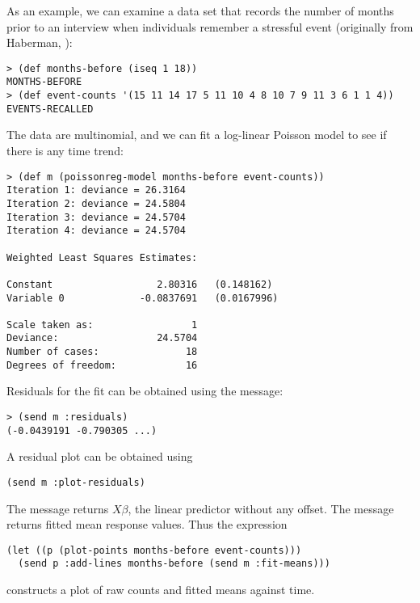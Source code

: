 As an example, we can examine a data set that records the number of
months prior to an interview when individuals remember a stressful
event (originally from Haberman, \cite[p. 2]{JKL}):
\begin{verbatim}
> (def months-before (iseq 1 18))
MONTHS-BEFORE
> (def event-counts '(15 11 14 17 5 11 10 4 8 10 7 9 11 3 6 1 1 4))
EVENTS-RECALLED
\end{verbatim}
The data are multinomial, and we can fit a log-linear Poisson model to
see if there is any time trend:
\begin{verbatim}
> (def m (poissonreg-model months-before event-counts))
Iteration 1: deviance = 26.3164
Iteration 2: deviance = 24.5804
Iteration 3: deviance = 24.5704
Iteration 4: deviance = 24.5704

Weighted Least Squares Estimates:

Constant                  2.80316   (0.148162)
Variable 0             -0.0837691   (0.0167996)

Scale taken as:                 1
Deviance:                 24.5704
Number of cases:               18
Degrees of freedom:            16
\end{verbatim}

Residuals for the fit can be obtained using the 
message:
\begin{verbatim}
> (send m :residuals)
(-0.0439191 -0.790305 ...)
\end{verbatim}
A residual plot can be obtained using
\begin{verbatim}
(send m :plot-residuals)
\end{verbatim}
The  message returns $X\beta$, the linear predictor
without any offset. The  message returns fitted mean
response values. Thus the expression
\begin{verbatim}
(let ((p (plot-points months-before event-counts)))
  (send p :add-lines months-before (send m :fit-means)))
\end{verbatim}
constructs a plot of raw counts and fitted means against time.

